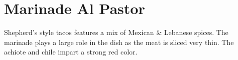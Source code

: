 \section[Marinade Al Pastor]{
    Marinade Al Pastor
}\label{marinade_al_pastor}

\begin{recipestats}[
        servings=3 \pound~meat,
        preptime=15 \minute,
        inactivetime=$[3 \ldots 12]~\hour$,
        source=Mike \& Jane,
        original=\citeauthor{rMartinezTacos2015}~\cite{rMartinezTacos2015},
    ]
\end{recipestats}

\begin{recipeabstract}
    Shepherd's style tacos features a mix of Mexican \& Lebanese spices.
    The marinade plays a large role in the dish as the meat is sliced very thin.
    The achiote and chile impart a strong red color.
\end{recipeabstract}

\begin{ingredientcolumns}
    \begin{ingredientblock}
        \\
        \\
        \\
        \\
        \\
    \end{ingredientblock}
    \begin{ingredientblock}
        \\
        \\
        \\
        \\
        \\
    \end{ingredientblock}
\end{ingredientcolumns}

